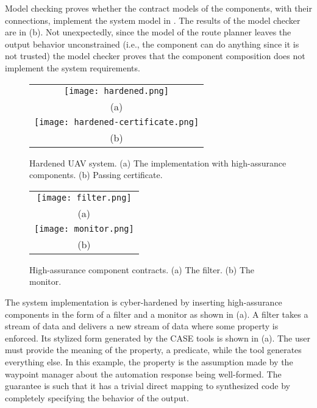 Model checking proves whether the contract models of the components, with their connections, implement the system model in . The results of the model checker are in (b). Not unexpectedly, since the model of the route planner leaves the output behavior unconstrained (i.e., the component can do anything since it is not trusted) the model checker proves that the component composition does not implement the system requirements.

\begin{figure*}
  \begin{center}
    \begin{tabular}{c}
      \texttt{[image: hardened.png]} \\
      (a) \\
      \texttt{[image: hardened-certificate.png]} \\
      (b)
    \end{tabular}
  \end{center}
  \caption{Hardened UAV system. (a) The implementation with high-assurance components. (b) Passing certificate.}
  \label{fig:hardened}
\end{figure*}

\begin{figure}
  \begin{center}
    \begin{tabular}{c}
      \texttt{[image: filter.png]} \\
      (a) \\
      \texttt{[image: monitor.png]} \\
      (b)
    \end{tabular}
  \end{center}
  \caption{High-assurance component contracts. (a) The filter. (b) The monitor.}
  \label{fig:assurance}
\end{figure}

The system implementation is cyber-hardened by inserting high-assurance components in the form of a filter and a monitor as shown in (a). A filter takes a stream of data and delivers a new stream of data where some property is enforced. Its stylized form generated by the CASE tools is shown in (a). The user must provide the meaning of the property, a predicate, while the tool generates everything else. In this example, the property is the assumption made by the waypoint manager about the automation response being well-formed. The guarantee is such that it has a trivial direct mapping to synthesized code by completely specifying the behavior of the output.

